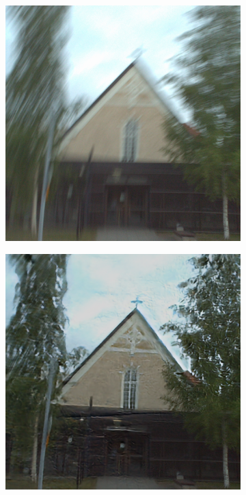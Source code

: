 \documentclass[10pt,twocolumn,letterpaper]{article}
\begin{document}
\vspace{-1cm}
\begin{figure}[h]
  \centering
  \begin{subfigure}{.5\columnwidth}
    \centering
    \includegraphics[width=\linewidth]{images/church.png}
  \end{subfigure}%
  \hfill
  \begin{subfigure}{.5\columnwidth}
    \centering
    \includegraphics[width=\linewidth]{images/church_dg.png}
  \end{subfigure}%
  \hfill
\end{figure}
\end{document}

